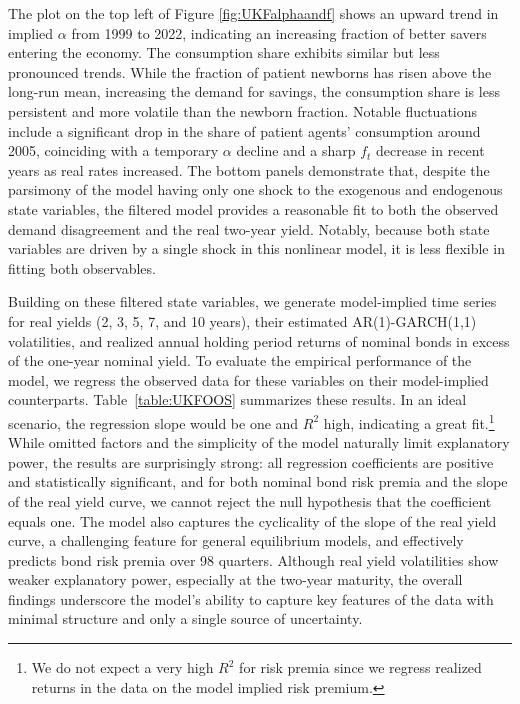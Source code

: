 \documentclass[preprint,11pt,authoryear]{elsarticle}
\theoremstyle{plain}
\begin{document}
The plot on the top left of Figure \ref{fig:UKFalphaandf} shows an upward trend in implied $\alpha$ from 1999 to 2022, indicating an increasing fraction of better savers entering the economy. The consumption share exhibits similar but less pronounced trends. While the fraction of patient newborns has risen above the long-run mean, increasing the demand for savings, the consumption share is less persistent and more volatile than the newborn fraction. Notable fluctuations include a significant drop in the share of patient agents' consumption around 2005, coinciding with a temporary $\alpha$ decline and a sharp $f_t$ decrease in recent years as real rates increased. The bottom panels demonstrate that, despite the parsimony of the model having only one shock to the exogenous and endogenous state variables, the filtered model provides a reasonable fit to both the observed demand disagreement and the real two-year yield. Notably, because both state variables are driven by a single shock in this nonlinear model, it is less flexible in fitting both observables.

Building on these filtered state variables, we generate model-implied time series for real yields (2, 3, 5, 7, and 10 years), their estimated AR(1)-GARCH(1,1) volatilities, and realized annual holding period returns of nominal bonds in excess of the one-year nominal yield. To evaluate the empirical performance of the model, we regress the observed data for these variables on their model-implied counterparts. Table~\ref{table:UKFOOS} summarizes these results. In an ideal scenario, the regression slope would be one and $R^2$ high, indicating a great fit.\footnote{We do not expect a very high $R^2$ for risk premia since we regress realized returns in the data on the model implied risk premium.} While omitted factors and the simplicity of the model naturally limit explanatory power, the results are surprisingly strong: all regression coefficients are positive and statistically significant, and for both nominal bond risk premia and the slope of the real yield curve, we cannot reject the null hypothesis that the coefficient equals one. The model also captures the cyclicality of the slope of the real yield curve, a challenging feature for general equilibrium models, and effectively predicts bond risk premia over 98 quarters. Although real yield volatilities show weaker explanatory power, especially at the two-year maturity, the overall findings underscore the model's ability to capture key features of the data with minimal structure and only a single source of uncertainty.
\end{document}
